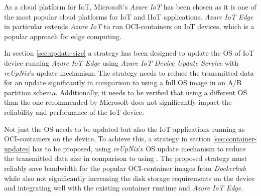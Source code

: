 As a cloud platform for \ac{IoT}, Microsoft's \textit{Azure IoT} has been chosen
as it is one of the most popular cloud platforms for \ac{IoT} and \ac{IIoT} applications.
\textit{Azure IoT Edge} in particular extends \textit{Azure IoT} to run
\ac{OCI}-containers on \ac{IoT} devices, which is a popular approach for edge
computing.

In section \ref{sec:update-size} a strategy has been designed to update the \ac{OS} of \ac{IoT} device running
\textit{Azure IoT Edge} using \textit{Azure IoT Device Update Service} with
\textit{reUpNix}'s update mechanism. The strategy needs to reduce the transmitted data
for an update significantly in comparison to using a full \ac{OS} image in an
A/B partition schema. Additionally, it needs to be verified that using a different
\ac{OS} than the one recommended by Microsoft does not significantly impact
the reliability and performance of the \ac{IoT} device.


Not just the \ac{OS} needs to be updated but also the \ac{IoT} applications
running as \ac{OCI}-containers on the device. To achieve this, 
a strategy in section \ref{sec:container-updates} has to be proposed,
using \textit{reUpNix}'s \ac{OS} update mechanism to reduce the transmitted data
size in comparison to using . The proposed strategy must
reliably save bandwidth for the popular \ac{OCI}-container images from
\textit{Dockerhub} while also not significantly increasing the disk storage
requirements on the device and integrating well with the existing container
runtime and \textit{Azure IoT Edge}.

